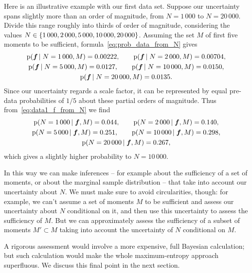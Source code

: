 \documentclass[\ifafour a4paper,12pt,\else a5paper,10pt,\fi%
onecolumn,oneside,article,%
british%
]{memoir}
\theoremstyle{remark}
\theoremstyle{innote}
\DeclarePairedDelimiter\set{\{}{\}}
\newcommand*{\pf}{\mathrm{p}}%
\renewcommand*{\|}{\nonscript\,\vert\nonscript\;\mathopen{}}
\newcommand*{\yff}{f}
\newcommand*{\yf}{\bm{\yff}}
\begin{document}
Here is an illustrative example with our first data set. Suppose our
uncertainty spans slightly more than an order of magnitude, from $N=1\,000$
to $N=20\,000$. Divide this range roughly into thirds of order of
magnitude, considering the values
$N\in \set{1\,000, 2\,000, 5\,000, 10\,000, 20\,000}$. Assuming the set $M$
of first five moments to be sufficient, formula~\eqref{eq:prob_data_from_N}
gives
\begin{equation}
  \label{eq:data1_f_from_N}
  \begin{gathered}
  \pf(\yf \| N=1\,000, M) =  0.00222,\qquad
  \pf(\yf \| N=2\,000, M) =  0.00704,\\
  \pf(\yf \| N=5\,000, M) =  0.0127,\qquad
  \pf(\yf \| N=10\,000, M) =  0.0150,\\
  \pf(\yf \| N=20\,000, M) =  0.0135.
\end{gathered}
\end{equation}
Since our uncertainty regards a scale factor, it can be represented by
equal pre-data probabilities of $1/5$ about these partial orders of
magnitude. Thus from~\eqref{eq:data1_f_from_N} we find
\begin{equation}
  \label{eq:data1_N_from_f}
  \begin{gathered}
  \pf(N=1\,000 \| \yf, M) =  0.044,\qquad
  \pf(N=2\,000 \| \yf, M) =  0.140,\\
  \pf(N=5\,000 \| \yf, M) =  0.251,\qquad
  \pf(N=10\,000 \| \yf, M) =  0.298,\\
  \pf(N=20\,000 \| \yf, M) =  0.267,
\end{gathered}
\end{equation}
which gives a slightly higher probability to $N=10\,000$.

\bigskip

In this way we can make inferences -- for example about the sufficiency of
a set of moments, or about the marginal sample distribution -- that take
into account our uncertainty about $N$. We must make sure to avoid
circularities, though: for example, we can't assume a set of moments $M$ to
be sufficient and assess our uncertainty about $N$ conditional on it, and
then use this uncertainty to assess the sufficiency of $M$. But we can
approximately assess the sufficiency of a subset of moments $M' \subset M$
taking into account the uncertainty of $N$ conditional on $M$.

A rigorous assessment would involve a more expensive, full Bayesian
calculation; but such calculation would make the whole maximum-entropy
approach superfluous. We discuss this final point in the next section.
\end{document}
